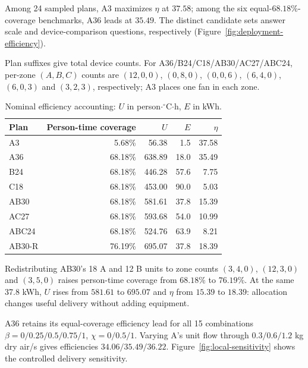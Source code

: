 Among 24 sampled plans, A3 maximizes $\eta$ at $37.58$; among the six equal-$68.18\%$-coverage benchmarks, A36 leads at $35.49$. The distinct candidate sets answer scale and device-comparison questions, respectively (Figure~\ref{fig:deployment-efficiency}).

Plan suffixes give total device counts. For A36/B24/C18/AB30/AC27/ABC24, per-zone $(A,B,C)$ counts are $(12,0,0)$, $(0,8,0)$, $(0,0,6)$, $(6,4,0)$, $(6,0,3)$ and $(3,2,3)$, respectively; A3 places one fan in each zone.

\begin{table}[!ht]
\centering\small
\caption{Nominal efficiency accounting: $U$ in person$\cdot{}^{\circ}$C$\cdot$h, $E$ in kWh.}
\label{tab:deployment-results}
\begin{tabular}{@{}lrrrr@{}}
\toprule
Plan & Person-time coverage & $U$ & $E$ & $\eta$\\
\midrule
A3 & 5.68\% & 56.38 & 1.5 & 37.58\\
A36 & 68.18\% & 638.89 & 18.0 & 35.49\\
B24 & 68.18\% & 446.28 & 57.6 & 7.75\\
C18 & 68.18\% & 453.00 & 90.0 & 5.03\\
AB30 & 68.18\% & 581.61 & 37.8 & 15.39\\
AC27 & 68.18\% & 593.68 & 54.0 & 10.99\\
ABC24 & 68.18\% & 524.76 & 63.9 & 8.21\\
AB30-R & 76.19\% & 695.07 & 37.8 & 18.39\\
\bottomrule
\end{tabular}
\end{table}

Redistributing AB30's 18 A and 12 B units to zone counts $(3,4,0)$, $(12,3,0)$ and $(3,5,0)$ raises person-time coverage from $68.18\%$ to $76.19\%$. At the same 37.8 kWh, $U$ rises from $581.61$ to $695.07$ and $\eta$ from $15.39$ to $18.39$: allocation changes useful delivery without adding equipment.

A36 retains its equal-coverage efficiency lead for all 15 combinations $\beta=0/0.25/0.5/0.75/1$, $\chi=0/0.5/1$. Varying A's unit flow through $0.3/0.6/1.2$ kg dry air/s gives efficiencies $34.06/35.49/36.22$. Figure~\ref{fig:local-sensitivity} shows the controlled delivery sensitivity.
